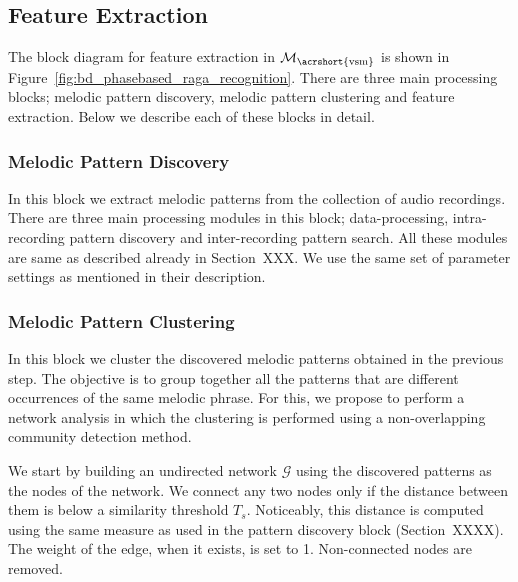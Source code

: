 

\subsection{Feature Extraction}
\label{sec:vsm_feature_extraction}

The block diagram for feature extraction in $\mathcal{M}_\mathrm{\acrshort{vsm}}$ is shown in Figure~\ref{fig:bd_phasebased_raga_recognition}. There are three main processing blocks; melodic pattern discovery, melodic pattern clustering and feature extraction. Below we describe each of these blocks in detail. 

\subsubsection{Melodic Pattern Discovery}
\label{sec:vsm_feature_extraction_pattern_discovery}
In this block we extract melodic patterns from the collection of audio recordings. There are three main processing modules in this block; data-processing, intra-recording pattern discovery and inter-recording pattern search. All these modules are same as described already in Section~XXX. We use the same set of parameter settings as mentioned in their description.

\subsubsection{Melodic Pattern Clustering}
\label{sec:vsm_feature_extraction_pattern_clustering}

In this block we cluster the discovered melodic patterns obtained in the previous step. The objective is to group together all the patterns that are different occurrences of the same melodic phrase. For this, we propose to perform a network analysis in which the clustering is performed using a non-overlapping community detection method. 

We start by building an undirected network $\mathcal{G}$ using the discovered patterns as the nodes of the network. We connect any two nodes only if the distance between them is below a similarity threshold $T_s$. Noticeably, this distance is computed using the same measure as used in the pattern discovery block (Section~XXXX). The weight of the edge, when it exists, is set to 1. Non-connected nodes are removed.

